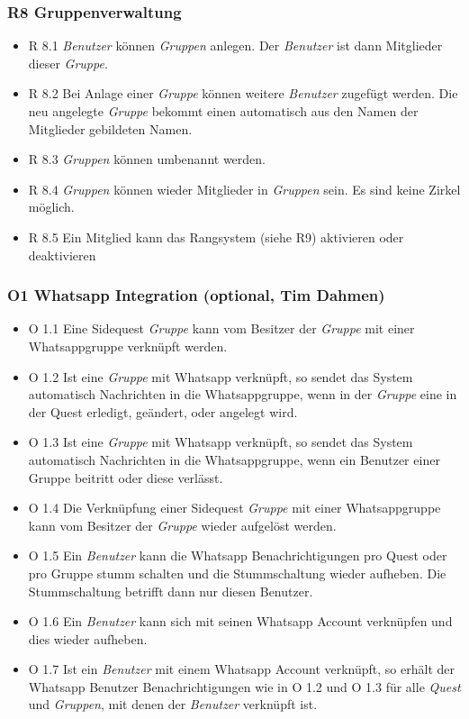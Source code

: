 \documentclass{article}
\begin{document}
\subsubsection{R8 Gruppenverwaltung}
    \begin{itemize}
        \item{R 8.1} \textit{Benutzer} können \textit{Gruppen} anlegen. Der \textit{Benutzer} ist dann Mitglieder dieser \textit{Gruppe}.
        \item{R 8.2} Bei Anlage einer \textit{Gruppe} können weitere \textit{Benutzer} zugefügt werden. Die neu angelegte \textit{Gruppe} bekommt einen automatisch aus den Namen der Mitglieder gebildeten Namen. 
        \item{R 8.3} \textit{Gruppen} können umbenannt werden. 
        \item{R 8.4} \textit{Gruppen} können wieder Mitglieder in \textit{Gruppen} sein. Es sind keine Zirkel möglich. 
        \item{R 8.5} Ein Mitglied kann das Rangsystem (siehe R9) aktivieren oder deaktivieren
    \end{itemize}
    

       
\subsubsection{O1 Whatsapp  Integration (optional, Tim Dahmen)}
    \begin{itemize}
        \item{O 1.1} Eine Sidequest \textit{Gruppe} kann vom Besitzer der  \textit{Gruppe} mit einer Whatsappgruppe verknüpft werden. 
        \item{O 1.2} Ist eine \textit{Gruppe} mit Whatsapp verknüpft, so sendet das System automatisch Nachrichten in die Whatsappgruppe, wenn in der \textit{Gruppe} eine in der Quest erledigt, geändert, oder angelegt wird.
        \item{O 1.3} Ist eine \textit{Gruppe} mit Whatsapp verknüpft, so sendet das System automatisch Nachrichten in die Whatsappgruppe, wenn ein Benutzer einer Gruppe beitritt oder diese verlässt.
        \item{O 1.4} Die Verknüpfung einer Sidequest \textit{Gruppe} mit einer Whatsappgruppe kann vom Besitzer der  \textit{Gruppe} wieder aufgelöst werden.  
        \item{O 1.5} Ein \textit{Benutzer} kann die Whatsapp Benachrichtigungen pro Quest oder pro Gruppe stumm schalten und die Stummschaltung wieder aufheben. Die Stummschaltung betrifft dann nur diesen Benutzer. 
        \item{O 1.6} Ein \textit{Benutzer} kann sich mit seinen Whatsapp Account verknüpfen und dies wieder aufheben. 
        \item{O 1.7} Ist ein \textit{Benutzer} mit einem Whatsapp Account verknüpft, so erhält der Whatsapp Benutzer Benachrichtigungen wie in O 1.2 und O 1.3 für alle \textit{Quest} und \textit{Gruppen}, mit denen der \textit{Benutzer}  verknüpft ist. 
    \end{itemize}
\end{document}

